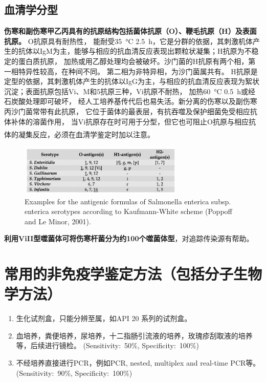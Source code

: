 \documentclass[cn,black,12pt,normal]{elegantnote}
\newcommand{\upcite}[1]{\textsuperscript{\textsuperscript{\cite{#1}}}}
\begin{document}
\subsection{血清学分型}
\textbf{伤寒和副伤寒甲乙丙具有的抗原结构包括菌体抗原（O）、鞭毛抗原（H）及表面抗原。}
O抗原具有耐热性，
能耐受\SI{35}{\celsius} \SI{2.5}{\hour}，它是分群的依据，其刺激机体产生的抗体以IgM为主，能够与相应的抗血清反应表现出颗粒状凝集；H抗原为不稳定的蛋白质抗原，
加热或用乙醇处理均会被破坏。沙门菌的H抗原有两个相，第一相特异性较高，在种间不同。
第二相为非特异相，为沙门菌属共有。
H抗原是定型的依据，其刺激机体产生的抗体以IgG为主，与相应的抗血清反应表现为絮状沉淀；表面抗原包括Vi、M和5抗原三种，Vi抗原不耐热，
加热\SI{60}{\celsius} \SI{0.5}{\hour}或经石炭酸处理即可破坏，
经人工培养基传代后也易失活。新分离的伤寒以及副伤寒丙沙门菌常带有此抗原，
它位于菌体的最表层，有抗吞噬及保护细菌免受相应抗体补体的溶菌作用，
当Vi抗原存在时可用于分型，但它也可阻止O抗原与相应抗体的凝集反应，必须在血清学鉴定时加以注意。\upcite{戚中田2014医学微生物学}

\begin{figure}[H]
    \centering
    \includegraphics[width=0.7\textwidth]{image/Screen Shot 2021-05-10 at 10.55.32.png}
    \caption{Examples for the antigenic formulas of Salmonella enterica subsp. enterica serotypes according to Kaufmann-White scheme (Poppoff and Le Minor, 2001). }
    \label{F-03}
\end{figure}

\textbf{利用ViII型噬菌体可将伤寒杆菌分为约100个噬菌体型}，对追踪传染源有帮助。

\section{常用的非免疫学鉴定方法（包括分子生物学方法）}



\begin{enumerate}
    \item 生化试剂盒，只能分辨至属，如API 20 系列的试剂盒。
    \item 血培养，粪便培养，尿培养，十二指肠引流液的培养，玫瑰疹刮取液的培养等，后续进行镜检。 (Sensitivity:~50\%, Specificity:~100\%)
    \item 不经培养直接进行PCR，例如PCR, nested, multiplex and real-time PCR等。(Sensitivity:~90\%, Specificity:~100\%)
\end{enumerate}
\end{document}
